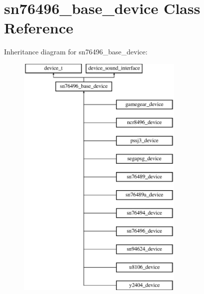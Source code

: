 \hypertarget{classsn76496__base__device}{\section{sn76496\-\_\-base\-\_\-device Class Reference}
\label{classsn76496__base__device}
}
Inheritance diagram for sn76496\-\_\-base\-\_\-device\-:\begin{figure}[H]
\begin{center}
\leavevmode
\includegraphics[height=12.000000cm]{classsn76496__base__device}
\end{center}
\end{figure}
